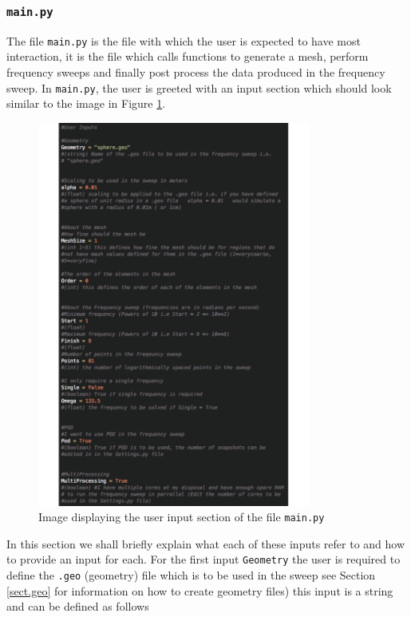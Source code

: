 \subsubsection{\texttt{main.py}}\label{sectmain.py}
The file \texttt{main.py} is the file with which the user is expected to have most interaction, it is the file which calls functions to generate a mesh, perform frequency sweeps and finally post process the data produced in the frequency sweep. In \texttt{main.py}, the user is greeted with an input section which should look similar to the image in Figure \ref{fig:main.py}.
\begin{figure}[H]
\begin{center}
\includegraphics[width=0.8\textwidth]{Figures/mainpy.pdf}
\caption{Image displaying the user input section of the file \texttt{main.py}}\label{fig:main.py}
\end{center}
\end{figure}
\noindent
In this section we shall briefly explain what each of these inputs refer to and how to provide an input for each. For the first input \texttt{Geometry} the user is required to define the \texttt{.geo} (geometry) file which is to be used in the sweep see Section \ref{sect.geo} for information on how to create geometry files) this input is a string and can be defined as follows \\
